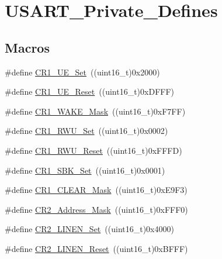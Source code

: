 \hypertarget{group___u_s_a_r_t___private___defines}{}\section{U\+S\+A\+R\+T\+\_\+\+Private\+\_\+\+Defines}
\label{group___u_s_a_r_t___private___defines}
\subsection*{Macros}
\begin{DoxyCompactItemize}
\item 
\#define \mbox{\hyperlink{group___u_s_a_r_t___private___defines_ga95f5821be56b1a5dbfdd38fdb37ed54c}{C\+R1\+\_\+\+U\+E\+\_\+\+Set}}~((uint16\+\_\+t)0x2000)
\item 
\#define \mbox{\hyperlink{group___u_s_a_r_t___private___defines_ga9c75a44192cb3dbbbf509cddfc47481c}{C\+R1\+\_\+\+U\+E\+\_\+\+Reset}}~((uint16\+\_\+t)0x\+D\+F\+F\+F)
\item 
\#define \mbox{\hyperlink{group___u_s_a_r_t___private___defines_gae4045dea092c3cbfe07d14fef39195ce}{C\+R1\+\_\+\+W\+A\+K\+E\+\_\+\+Mask}}~((uint16\+\_\+t)0x\+F7\+F\+F)
\item 
\#define \mbox{\hyperlink{group___u_s_a_r_t___private___defines_ga5cb566b7c5e126e5ef11dd25bba50ffa}{C\+R1\+\_\+\+R\+W\+U\+\_\+\+Set}}~((uint16\+\_\+t)0x0002)
\item 
\#define \mbox{\hyperlink{group___u_s_a_r_t___private___defines_ga064a46d19ffffddd410e969798d335ee}{C\+R1\+\_\+\+R\+W\+U\+\_\+\+Reset}}~((uint16\+\_\+t)0x\+F\+F\+F\+D)
\item 
\#define \mbox{\hyperlink{group___u_s_a_r_t___private___defines_ga2813b7fa1263aecfeefa48f8a55938b9}{C\+R1\+\_\+\+S\+B\+K\+\_\+\+Set}}~((uint16\+\_\+t)0x0001)
\item 
\#define \mbox{\hyperlink{group___u_s_a_r_t___private___defines_ga67f7dd35ea3d1296677e5fc50b88fa90}{C\+R1\+\_\+\+C\+L\+E\+A\+R\+\_\+\+Mask}}~((uint16\+\_\+t)0x\+E9\+F3)
\item 
\#define \mbox{\hyperlink{group___u_s_a_r_t___private___defines_ga080c343a5a95d4419789b94405c27764}{C\+R2\+\_\+\+Address\+\_\+\+Mask}}~((uint16\+\_\+t)0x\+F\+F\+F0)
\item 
\#define \mbox{\hyperlink{group___u_s_a_r_t___private___defines_gabc3f2b022d70a11fd0605e58cb23023f}{C\+R2\+\_\+\+L\+I\+N\+E\+N\+\_\+\+Set}}~((uint16\+\_\+t)0x4000)
\item 
\#define \mbox{\hyperlink{group___u_s_a_r_t___private___defines_ga7b8fbe7be4c85c16ea1c1e3c9fa95b05}{C\+R2\+\_\+\+L\+I\+N\+E\+N\+\_\+\+Reset}}~((uint16\+\_\+t)0x\+B\+F\+F\+F)

\end{DoxyCompactItemize}
